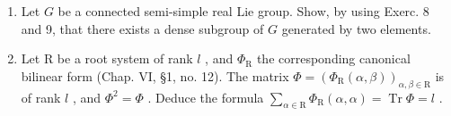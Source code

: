 \begin{enumerate}
\def\labelenumi{\arabic{enumi})}
\setcounter{enumi}{9}
\item
  Let \(G\) be a connected semi-simple real Lie group. Show, by using Exerc. 8 and 9, that there exists a dense subgroup of \(G\) generated by two elements.
\item
  Let \(\mathrm{R}\) be a root system of rank \(l\) , and \(\varPhi_{\mathrm{R}}\) the corresponding canonical bilinear form (Chap. VI, §1, no. 12). The matrix \(\varPhi = (\varPhi_{\mathrm{R}}(\alpha, \beta))_{\alpha, \beta \in \mathrm{R}}\) is of rank \(l\) , and \(\varPhi^2 = \varPhi\) . Deduce the formula \(\sum_{\alpha \in \mathrm{R}} \varPhi_{\mathrm{R}}(\alpha, \alpha) = \operatorname{Tr} \varPhi = l\) .
\end{enumerate}

